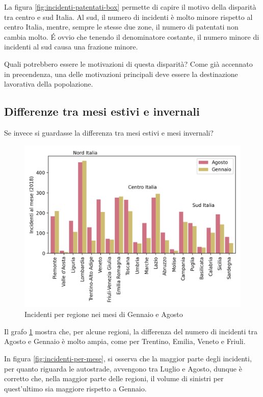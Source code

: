 \documentclass[a4paper]{report}
\begin{document}
La figura \ref{fig:incidenti-patentati-box} permette di capire il motivo della disparità 
tra centro e sud Italia.
Al sud, il numero di incidenti è molto minore rispetto al centro Italia, mentre, 
sempre le stesse due zone, il numero di patentati non cambia molto. 
\'E ovvio che tenendo il denominatore costante, il numero minore di incidenti al 
sud causa una frazione minore.

Quali potrebbero essere le motivazioni di questa disparità?
Come già accennato in precendenza, una delle motivazioni principali 
deve essere la destinazione lavorativa della popolazione.

\subsection{Differenze tra mesi estivi e invernali}

Se invece si guardasse la differenza tra mesi estivi e mesi invernali?

\begin{figure}
    \includegraphics[width=\linewidth]{../src/incidenti/incidenti_aci/mappe_regioni/incidenti_estate_inverno.png}
    \caption{Incidenti per regione nei mesi di Gennaio e Agosto}
    \label{fig:incidenti-estate-inverno}
\end{figure}

Il grafo \ref{fig:incidenti-estate-inverno} mostra che, per alcune regioni, la differenza del  
numero di incidenti tra Agosto e Gennaio è molto ampia, come per Trentino, Emilia, Veneto e Friuli.

In figura \ref{fig:incidenti-per-mese}, si osserva che la maggior parte degli incidenti, 
per quanto riguarda le autostrade, avvengono tra Luglio e Agosto, dunque è corretto che,  
nella maggior parte delle regioni, il volume di sinistri per quest'ultimo sia maggiore 
rispetto a Gennaio. 
\end{document}
